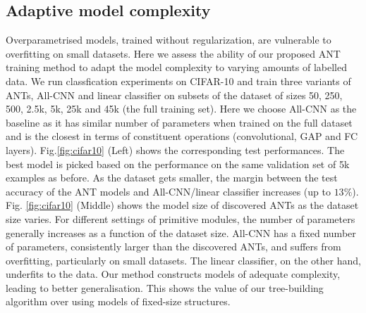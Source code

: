 

\subsection{Adaptive model complexity}
Overparametrised models, trained without regularization, are vulnerable to overfitting on small datasets. Here we assess the ability of our proposed ANT training method to adapt the model complexity to varying amounts of labelled data. We run classfication experiments on CIFAR-10 and train three variants of ANTs, All-CNN \cite{springenberg2014striving} and linear classifier on subsets of the dataset of sizes 50, 250, 500, 2.5k, 5k, 25k and 45k (the full training set). Here we choose All-CNN as the baseline as it has similar number of parameters when trained on the full dataset and is the closest in terms of constituent operations (convolutional, GAP and FC layers).
Fig.\ref{fig:cifar10} (Left) shows the corresponding test performances. The best model is picked based on the performance on the same validation set of 5k examples as before. As the dataset gets smaller, the margin between the test accuracy of the ANT models and All-CNN/linear classifier increases (up to $13\%$). Fig. \ref{fig:cifar10} (Middle) shows the model size of discovered ANTs as the dataset size varies. For different settings of primitive modules, the number of parameters generally increases as a function of the dataset size. All-CNN has a fixed number of parameters, consistently larger than the discovered ANTs, and suffers from overfitting, particularly on small datasets. The linear classifier, on the other hand, underfits to the data. Our method constructs models of adequate complexity, leading to better generalisation. This shows the value of our tree-building algorithm over using models of fixed-size structures.
